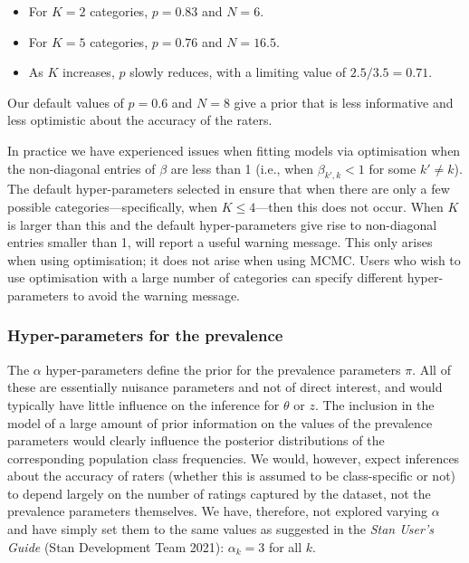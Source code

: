 \begin{itemize}
\item
  For \(K = 2\) categories, \(p = 0.83\) and \(N = 6\).
\item
  For \(K = 5\) categories, \(p = 0.76\) and \(N = 16.5\).
\item
  As \(K\) increases, \(p\) slowly reduces, with a limiting value of
  \(2.5 / 3.5 = 0.71\).
\end{itemize}

Our default values of \(p = 0.6\) and \(N = 8\) give a prior that is less
informative and less optimistic about the accuracy of the raters.

In practice we have experienced issues when fitting models via
optimisation when the non-diagonal entries of \(\beta\) are less than 1
(i.e., when \(\beta_{k', k} < 1\) for some \(k' \neq k\)). The default
hyper-parameters selected in  ensure that when
there are only a few possible categories---specifically, when
\(K \leqslant 4\)---then this does not occur. When \(K\) is larger than this
and the default hyper-parameters give rise to non-diagonal entries
smaller than 1,  will report a useful warning message.
This only arises when using optimisation; it does not arise when using MCMC.
Users who wish to use optimisation with a large number of categories can
specify different hyper-parameters to avoid the warning message.

\hypertarget{hyper-parameters-for-the-prevalence}{%
\subsubsection{Hyper-parameters for the prevalence}\label{hyper-parameters-for-the-prevalence}}

The \(\alpha\) hyper-parameters define the prior for the prevalence parameters \(\pi\).
All of these are essentially nuisance parameters and not of direct interest,
and would typically have little influence on the inference for \(\theta\) or \(z\).
The inclusion in the model of a large amount of prior information on the values
of the prevalence parameters would clearly influence the posterior distributions
of the corresponding population class frequencies. We would, however, expect
inferences about the accuracy of raters (whether this is assumed to be class-specific
or not) to depend largely on the number of ratings captured by the dataset,
not the prevalence parameters themselves. We have, therefore, not explored varying
\(\alpha\) and have simply set them to the same values as suggested in the
\emph{Stan User's Guide} (Stan Development Team 2021): \(\alpha_k = 3\) for all \(k\).

